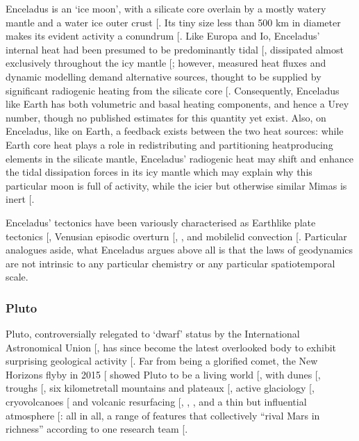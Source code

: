 \documentclass[letterpaper,10pt,english]{jupyterBook}
\begin{document}
\sphinxAtStartPar
Enceladus is an ‘ice moon’, with a silicate core overlain by a mostly watery mantle and a water ice outer crust {[}\sphinxcite{references:id164}{]}. Its tiny size \sphinxhyphen{} less than 500 km in diameter \sphinxhyphen{} makes its evident activity a conundrum {[}\sphinxcite{references:id168}{]}. Like Europa and Io, Enceladus’ internal heat had been presumed to be predominantly tidal {[}\sphinxcite{references:id176}{]}, dissipated almost exclusively throughout the icy mantle {[}\sphinxcite{references:id165}{]}; however, measured heat fluxes and dynamic modelling demand alternative sources, thought to be supplied by significant radiogenic heating from the silicate core {[}\sphinxcite{references:id163}{]}. Consequently, Enceladus \sphinxhyphen{} like Earth \sphinxhyphen{} has both volumetric and basal heating components, and hence a Urey number, though no published estimates for this quantity yet exist. Also, on Enceladus, like on Earth, a feedback exists between the two heat sources: while Earth core heat plays a role in redistributing and partitioning heat\sphinxhyphen{}producing elements in the silicate mantle, Enceladus’ radiogenic heat may shift and enhance the tidal dissipation forces in its icy mantle \sphinxhyphen{} which may explain why this particular moon is full of activity, while the icier but otherwise similar Mimas is inert {[}\sphinxcite{references:id163}{]}.

\sphinxAtStartPar
Enceladus’ tectonics have been variously characterised as Earth\sphinxhyphen{}like plate tectonics {[}\sphinxcite{references:id167}{]}, Venusian episodic overturn {[}, \sphinxcite{references:id166}{]}, and mobile\sphinxhyphen{}lid convection {[}\sphinxcite{references:id158}{]}. Particular analogues aside, what Enceladus argues above all is that the laws of geodynamics are not intrinsic to any particular chemistry or any particular spatiotemporal scale.


\subsubsection{Pluto}
\label{\detokenize{content/chapter_01_background/main:pluto}}
\sphinxAtStartPar
Pluto, controversially relegated to ‘dwarf’ status by the International Astronomical Union {[}\sphinxcite{references:id148}{]}, has since become the latest overlooked body to exhibit surprising geological activity {[}\sphinxcite{references:id141}{]}. Far from being a glorified comet, the New Horizons flyby in 2015 {[}\sphinxcite{references:id154}{]} showed Pluto to be a living world {[}\sphinxcite{references:id152}{]}, with dunes {[}\sphinxcite{references:id151}{]}, troughs {[}\sphinxcite{references:id149}{]}, six kilometre\sphinxhyphen{}tall mountains and plateaux {[}\sphinxcite{references:id134}{]}, active glaciology {[}\sphinxcite{references:id147}{]}, cryovolcanoes {[}\sphinxcite{references:id133}{]} and volcanic resurfacing {[}, , \sphinxcite{references:id146}{]}, and a thin but influential atmosphere {[}\sphinxcite{references:id150}{]}: all in all, a range of features that collectively “rival Mars in richness” according to one research team {[}\sphinxcite{references:id153}{]}.
\end{document}
